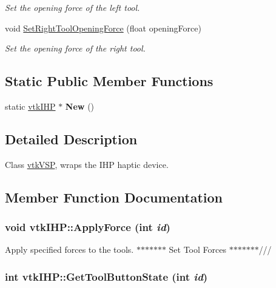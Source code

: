 \begin{DoxyCompactItemize}
\begin{DoxyCompactList}\small\item\em Set the opening force of the left tool. \item\end{DoxyCompactList}\item 
\hypertarget{classvtkIHP_ada52401a0aee8798419e646a5007564f}{
void \hyperlink{classvtkIHP_ada52401a0aee8798419e646a5007564f}{SetRightToolOpeningForce} (float openingForce)}
\label{classvtkIHP_ada52401a0aee8798419e646a5007564f}

\begin{DoxyCompactList}\small\item\em Set the opening force of the right tool. \item\end{DoxyCompactList}\end{DoxyCompactItemize}
\subsection*{Static Public Member Functions}
\begin{DoxyCompactItemize}
\item 
\hypertarget{classvtkIHP_affd59f555c461c184edfd5e1072ebe79}{
static \hyperlink{classvtkIHP}{vtkIHP} $\ast$ {\bfseries New} ()}
\label{classvtkIHP_affd59f555c461c184edfd5e1072ebe79}

\end{DoxyCompactItemize}


\subsection{Detailed Description}
Class \hyperlink{classvtkVSP}{vtkVSP}, wraps the IHP haptic device. 

\subsection{Member Function Documentation}
\hypertarget{classvtkIHP_a541bcaa9e51b0a6a8b727ba8c7fbfc82}{
\subsubsection[{ApplyForce}]{\setlength{\rightskip}{0pt plus 5cm}void vtkIHP::ApplyForce (int {\em id})}}
\label{classvtkIHP_a541bcaa9e51b0a6a8b727ba8c7fbfc82}


Apply specified forces to the tools. $\ast$$\ast$$\ast$$\ast$$\ast$$\ast$$\ast$ Set Tool Forces $\ast$$\ast$$\ast$$\ast$$\ast$$\ast$$\ast$/// \hypertarget{classvtkIHP_a5679a7f0539274650ba046cbf5e0535a}{
\subsubsection[{GetToolButtonState}]{\setlength{\rightskip}{0pt plus 5cm}int vtkIHP::GetToolButtonState (int {\em id})}}
\label{classvtkIHP_a5679a7f0539274650ba046cbf5e0535a}


